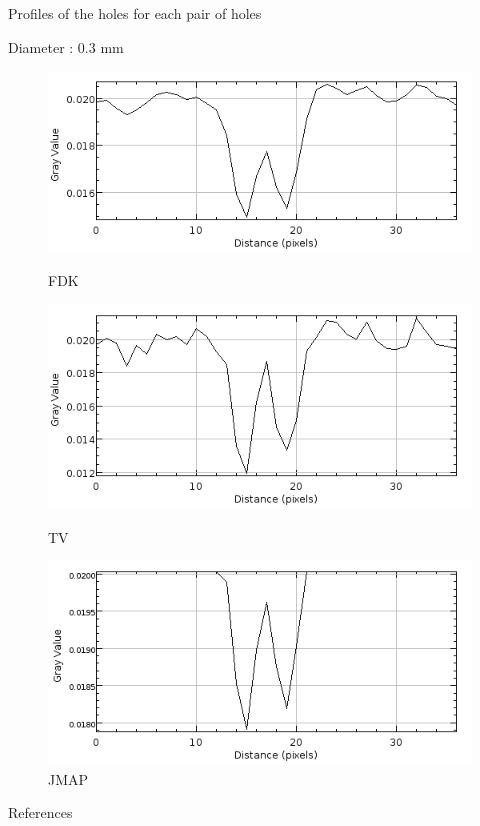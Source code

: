 \documentclass[latex]{beamer}
\begin{document}
\begin{frame}{Profiles of the holes for each pair of holes}
\begin{block}{Diameter : 0.3 mm}
\begin{figure}
\begin{minipage}[htb]{0.46\linewidth}
\centering
\includegraphics[scale=0.27]{ProfilsTrousIQICalculResolution/FDK/300proj/ProfilTrousTaille5.png}
\caption*{FDK}
\end{minipage} \hfill
\begin{minipage}[htb]{0.46\linewidth}
\centering
\includegraphics[scale=0.27]{ProfilsTrousIQICalculResolution/TV/300proj/ProfilTrousTaille5.png}
\caption*{TV}
\end{minipage} \vfill
\begin{minipage}[htb]{0.46\linewidth}
\centering
\includegraphics[scale=0.27]{ProfilsTrousIQICalculResolution/JMAPMGINonSplitGamma3K4/300proj/ProfilTrousTaille5.png}
\caption*{JMAP}
\end{minipage}
\end{figure}
\end{block}
\end{frame}

\begin{frame}{References}


\end{frame}
\end{document}
